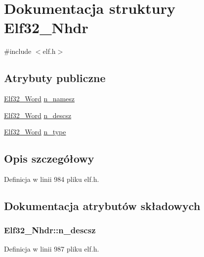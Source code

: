 \hypertarget{struct_elf32___nhdr}{\section{Dokumentacja struktury Elf32\-\_\-\-Nhdr}
\label{struct_elf32___nhdr}
}


{\ttfamily \#include $<$elf.\-h$>$}

\subsection*{Atrybuty publiczne}
\begin{DoxyCompactItemize}
\item 
\hyperlink{elf_8h_af5924ece606c732e86f8263a19408e45}{Elf32\-\_\-\-Word} \hyperlink{struct_elf32___nhdr_a8e6389f882a5c695518a833b4c1bd9c6}{n\-\_\-namesz}
\item 
\hyperlink{elf_8h_af5924ece606c732e86f8263a19408e45}{Elf32\-\_\-\-Word} \hyperlink{struct_elf32___nhdr_ad83450c86fb3e14d1096a141ea705f33}{n\-\_\-descsz}
\item 
\hyperlink{elf_8h_af5924ece606c732e86f8263a19408e45}{Elf32\-\_\-\-Word} \hyperlink{struct_elf32___nhdr_afdab20b47522cb964500a200ceb92462}{n\-\_\-type}
\end{DoxyCompactItemize}


\subsection{Opis szczegółowy}


Definicja w linii 984 pliku elf.\-h.



\subsection{Dokumentacja atrybutów składowych}
\hypertarget{struct_elf32___nhdr_ad83450c86fb3e14d1096a141ea705f33}{
\subsubsection[{n\-\_\-descsz}]{ Elf32\-\_\-\-Nhdr\-::n\-\_\-descsz}}\label{struct_elf32___nhdr_ad83450c86fb3e14d1096a141ea705f33}


Definicja w linii 987 pliku elf.\-h.

